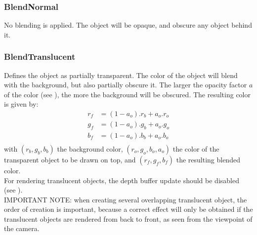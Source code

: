 \subsubsection{BlendNormal \label{T:BlendType|BlendNormal}}
No blending is applied. The object will be opaque, and obscure any object behind it.

\subsubsection{BlendTranslucent \label{T:BlendType|BlendTranslucent}}
Defines the object as partially transparent. The color of the object will blend with the background, but also partially obscure it. The larger the opacity factor $a$ of the color (see ), the more the background will be obscured. The resulting color is given by:
\begin{equation}
\begin{array}{rcl}
r_f & = (1-a_o) . r_b + a_o . r_o \\
g_f & = (1-a_o) . g_b + a_o . g_o \\
b_f & = (1-a_o) . b_b + a_o . b_o \\
\end{array}
\end{equation}
with $(r_b,g_b,b_b)$ the background color, $(r_o,g_o,b_o,a_o)$ the color of the transparent object to be drawn on top, and $(r_f,g_f,b_f)$ the resulting blended color. \\
For rendering translucent objects, the depth buffer update should be disabled (see ). \\
IMPORTANT NOTE: when creating several overlapping translucent object, the order of creation is important, because a correct effect will only be obtained if the translucent objects are rendered from back to front, as seen from the viewpoint of the camera.

